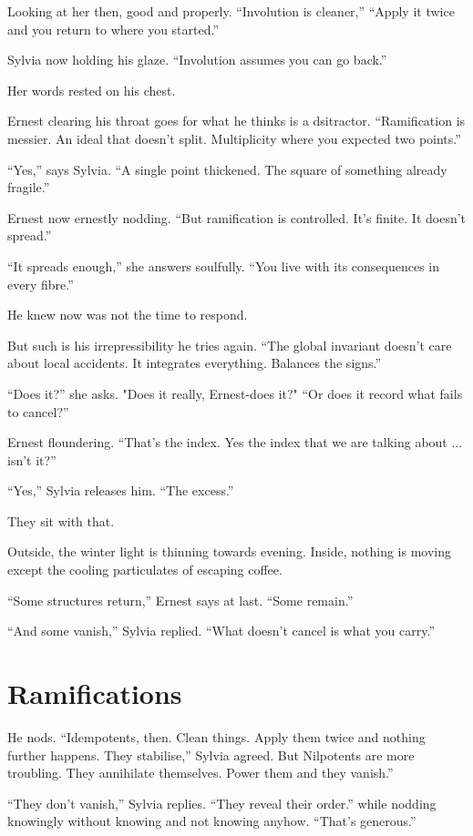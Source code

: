 Looking at her then, good and properly.
“Involution is cleaner,” 
“Apply it twice and you return to where you started.”

Sylvia now holding his glaze.
“Involution assumes you can go back.”

Her words rested on his chest.

Ernest clearing his throat goes for what he thinks is a dsitractor.
“Ramification is messier.
An ideal that doesn’t split.
Multiplicity where you expected two points.”

“Yes,” says Sylvia.
“A single point thickened.
The square of something already fragile.”

Ernest now ernestly nodding. “But ramification is controlled.
It’s finite. It doesn’t spread.”

“It spreads enough,” she answers soulfully.
“You live with its consequences in every fibre.”

He knew now was not the time to respond.

But such is his irrepressibility he tries again.
“The global invariant doesn’t care about local accidents.
It integrates everything. Balances the signs.”

“Does it?” she asks. "Does it really, Ernest-does it?"
“Or does it record what fails to cancel?”

Ernest floundering.
“That’s the index. Yes the index that we are talking about ... isn't it?”

“Yes,” Sylvia releases him.
“The excess.”

They sit with that.

Outside, the winter light is thinning towards evening. Inside, nothing is moving except the cooling particulates of escaping coffee.

“Some structures return,” Ernest says at last.
“Some remain.”

“And some vanish,” Sylvia replied.
“What doesn’t cancel is what you carry.”

\section*{Ramifications}

He nods. “Idempotents, then.
Clean things. Apply them twice and nothing further happens. They stabilise,” Sylvia agreed. But Nilpotents are more troubling. They annihilate themselves. Power them and they vanish.”

“They don’t vanish,” Sylvia replies. “They reveal their order.” while nodding knowingly without knowing and not knowing anyhow. “That’s generous.”

